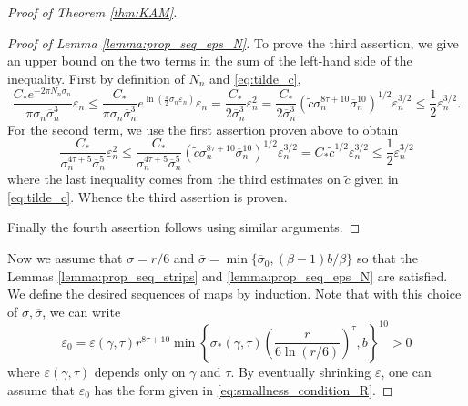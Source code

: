 \documentclass[10pt]{article}
\begin{document}
\begin{proof}[Proof of Theorem \ref{thm:KAM}]
\begin{proof}[Proof of Lemma \ref{lemma:prop_seq_eps_N}]
To prove the third assertion, we give an upper bound on the two terms in the sum of the left-hand side of the inequality. First by definition of $N_n$ and \eqref{eq:tilde_c},
\[
    \frac{C_\ast e^{-2\pi N_n\sigma_n}}{\pi\sigma_n \overline \sigma_n^3}\varepsilon_n
    \leq 
    \frac{C_\ast}{\pi\sigma_n\overline \sigma_n^3}
    e^{
    \ln\left(
    \frac{\pi}{2}\sigma_n\varepsilon_n
    \right)
    }
    \varepsilon_n
    =
        \frac{C_\ast}{2 \overline \sigma_n^3}  \varepsilon^{2}_n
        =
    \frac{C_\ast}{2 \overline \sigma_n^3}  \left(\tilde c\sigma_n^{8\tau+10}\overline\sigma_n^{10}\right)^{1/2}\varepsilon^{3/2}_n
    \leq
    \frac{1}{2}\varepsilon_n^{3/2}.
\]
For the second term, we use the first assertion proven above to obtain
\[
    \frac{C_\ast}{\sigma_n^{4\tau+5}\overline\sigma_n^5}\varepsilon_n^2
    \leq
    \frac{C_\ast}{\sigma_n^{4\tau+5}\overline\sigma_n^5}
    \left(\tilde c\sigma_n^{8\tau+10}\overline\sigma_n^{10}\right)^{1/2}
    \varepsilon_n^{3/2}
    = 
    C_\ast\tilde c^{1/2}\varepsilon_n^{3/2}
    \leq 
    \frac{1}{2}\varepsilon_n^{3/2}
\]
where the last inequality comes from the third estimates on $\tilde c$ given in \eqref{eq:tilde_c}. Whence the third assertion is proven. 

Finally the fourth assertion follows using similar arguments.
\end{proof}

\vspace{0.2cm}
Now we assume that $\sigma =  r/6$ and $\overline\sigma= \min\{\overline\sigma_0,(\beta-1)b/\beta\}
$ so that the Lemmas \ref{lemma:prop_seq_strips} and \ref{lemma:prop_seq_eps_N} are satisfied. We define the desired sequences of maps by induction. Note that with this choice of $\sigma, \overline\sigma$, we can write 
\[
\varepsilon_0 = \varepsilon(\gamma,\tau)r^{8\tau + 10}
\min\left\{\sigma_\ast(\gamma,\tau)\left(\frac{r}{6\ln (r/6)}\right)^{\tau},b\right\}^{10}>0
\]
where $\varepsilon(\gamma,\tau)$ depends only on $\gamma$ and $\tau$. By eventually shrinking $\varepsilon$, one can assume that $\varepsilon_0$ has the form given in \eqref{eq:smallness_condition_R}.


\end{proof}
\end{document}
